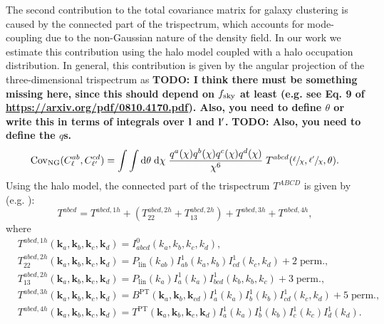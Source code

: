 \documentclass[a4paper,11pt]{article}
\newcommand{\todo}[1]{{\bf TODO: #1}}
\begin{document}
    The second contribution to the total covariance matrix for galaxy clustering is caused by the connected part of the trispectrum, which accounts for mode-coupling due to the non-Gaussian nature of the density field. In our work we estimate this contribution using the halo model coupled with a halo occupation distribution. In general, this contribution is given by the angular projection of the three-dimensional trispectrum as \todo{I think there must be something missing here, since this should depend on $f_{\rm sky}$ at least (e.g. see Eq. 9 of \url{https://arxiv.org/pdf/0810.4170.pdf}). Also, you need to define $\theta$ or write this in terms of integrals over ${\bf l}$ and ${\bf l}'$.} \todo{Also, you need to define the $q$s.}
    \begin{equation}
      \mathrm{Cov}_{\mathrm{NG}}(C^{ab}_{\ell}, C^{cd}_{\ell'}) = \int \int \mathrm{d}\theta \;\mathrm{d}\chi \; \frac{q^{a}(\chi)q^{b}(\chi)q^{c}(\chi)q^{d}(\chi)}{\chi^{6}} \; T^{abcd}(\sfrac{\ell}{\chi}, \sfrac{\ell'}{\chi}, \theta).
    \end{equation}
    Using the halo model, the connected part of the trispectrum $T^{ABCD}$ is given by (e.g. \cite{Takada:2013}):
    \begin{equation}
      T^{abcd} = T^{abcd, 1h} + (T^{abcd, 2h}_{22} + T^{abcd, 2h}_{13}) + T^{abcd, 3h} + T^{abcd, 4h},
    \end{equation}
    where
    \begin{align}
      &T^{abcd, 1h}(\mathbf{k}_{a}, \mathbf{k}_{b}, \mathbf{k}_{c}, \mathbf{k}_{d}) = I^{0}_{abcd}(k_{a}, k_{b}, k_{c}, k_{d}), \\
      &T^{abcd, 2h}_{22}(\mathbf{k}_{a}, \mathbf{k}_{b}, \mathbf{k}_{c}, \mathbf{k}_{d}) = P_{\mathrm{lin}}(k_{ab})I^{1}_{ab}(k_{a}, k_{b})I^{1}_{cd}(k_{c}, k_{d}) + 2 \; \mathrm{perm.}, \\
      &T^{abcd, 2h}_{13}(\mathbf{k}_{a}, \mathbf{k}_{b}, \mathbf{k}_{c}, \mathbf{k}_{d}) = P_{\mathrm{lin}}(k_{a})I^{1}_{a}(k_{a})I^{1}_{bcd}(k_{b}, k_{b}, k_{c}) + 3 \; \mathrm{perm.}, \\
      &T^{abcd, 3h}(\mathbf{k}_{a}, \mathbf{k}_{b}, \mathbf{k}_{c}, \mathbf{k}_{d}) = B^{\mathrm{PT}}(\mathbf{k}_{a}, \mathbf{k}_{b}, \mathbf{k}_{cd})I^{1}_{a}(k_{a})I^{1}_{b}(k_{b})I^{1}_{cd}(k_{c}, k_{d}) + 5 \; \mathrm{perm.}, \\
      &T^{abcd, 4h}(\mathbf{k}_{a}, \mathbf{k}_{b}, \mathbf{k}_{c}, \mathbf{k}_{d}) = T^{\mathrm{PT}}(\mathbf{k}_{a}, \mathbf{k}_{b}, \mathbf{k}_{c}, \mathbf{k}_{d})I^{1}_{a}(k_{a})I^{1}_{b}(k_{b})I^{1}_{c}(k_{c})I^{1}_{d}(k_{d}).
    \end{align}
\end{document}
